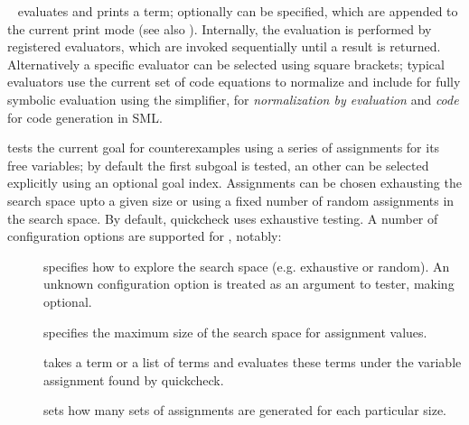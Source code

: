 \begin{isabellebody}
\begin{isamarkuptext}
  \begin{description}

  \item \hyperlink{command.HOL.value}{\mbox{}}~ evaluates and prints a
    term; optionally  can be specified, which are
    appended to the current print mode (see also \cite{isabelle-ref}).
    Internally, the evaluation is performed by registered evaluators,
    which are invoked sequentially until a result is returned.
    Alternatively a specific evaluator can be selected using square
    brackets; typical evaluators use the current set of code equations
    to normalize and include  for fully symbolic evaluation
    using the simplifier,  for \emph{normalization by evaluation}
    and \emph{code} for code generation in SML.

  \item \hyperlink{command.HOL.quickcheck}{\mbox{}} tests the current goal for
    counterexamples using a series of assignments for its
    free variables; by default the first subgoal is tested, an other
    can be selected explicitly using an optional goal index.
    Assignments can be chosen exhausting the search space upto a given
    size or using a fixed number of random assignments in the search space.
    By default, quickcheck uses exhaustive testing.
    A number of configuration options are supported for
    \hyperlink{command.HOL.quickcheck}{\mbox{}}, notably:

    \begin{description}

    \item[] specifies how to explore the search space
      (e.g. exhaustive or random).
      An unknown configuration option is treated as an argument to tester,
      making  optional.
    \item[] specifies the maximum size of the search space
    for assignment values.

    \item[] takes a term or a list of terms and evaluates
      these terms under the variable assignment found by quickcheck.

    \item[] sets how many sets of assignments are
    generated for each particular size.


\end{description}
\end{description}
\end{isamarkuptext}
\end{isabellebody}

